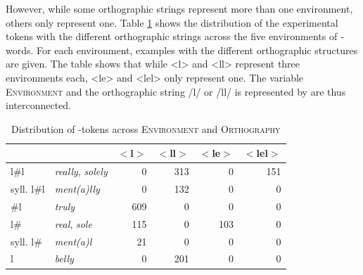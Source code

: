  However, while some orthographic strings represent more than one environment, others only represent one. 
Table \ref{tab: ly dazta ortho and environment} shows the distribution of the experimental tokens with the different orthographic strings across the five environments of -words. For each environment, examples with the different orthographic structures are given.
The table shows that while <l> and  <ll>  represent three environments each,  <le> and <lel> only represent one. 
The variable \textsc{Environment} and the orthographic string /l/ or /ll/ is represented by are thus interconnected. 


\begin{table} [h!]
	\caption{Distribution of -tokens across \textsc{Environment} and \textsc{Orthography}}
	\label{tab: ly dazta ortho and environment}
	
	\begin{center}
		\begin{tabular}{llrrrr}
			\hline
			&      & $<$l$>$  & $<$ll$>$ & $<$le$>$ & $<$lel$>$ \\
			
			\hline
			
			
			
			l\#l  &\color[HTML]{3166FF}\textit{really}, \color[HTML]{3166FF}\textit{solely}   
			&       0 &     313  &   0&    151\\
			
			syll. l\#l &\color[HTML]{3166FF}\textit{ment(a)lly}   &   0 &     132    &   0 &   0\\
			
			\#l   &\color[HTML]{3166FF}\textit{truly} &        609   &   0    &   0  &    0\\
			
			l\#   &\color[HTML]{3166FF}\textit{real}, \color[HTML]{3166FF}\textit{sole} &        115&   0  &         103& 0\\
			
			syll. l\#&\color[HTML]{3166FF}\textit{ment(a)l} &         21&   0  &    0 &     0\\
			
			l        &\color[HTML]{3166FF}\textit{belly}  &    0 &    201    &   0 &   0\\
			\hline
			
		\end{tabular}
	\end{center}
\end{table}


